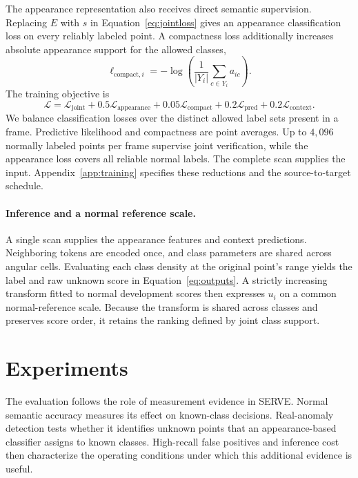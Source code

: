 \documentclass{article}
\begin{document}
The appearance representation also receives direct semantic supervision. Replacing $E$ with $s$ in Equation~\eqref{eq:jointloss} gives an appearance classification loss on every reliably labeled point. A compactness loss additionally increases absolute appearance support for the allowed classes,
\begin{equation}
 \ell_{\mathrm{compact},i}=-\log\left(\frac{1}{|Y_i|}\sum_{c\in Y_i}a_{ic}\right).
 \label{eq:compact}
\end{equation}
The training objective is
\begin{equation}
 \mathcal L=\mathcal L_{\mathrm{joint}}
 +0.5\mathcal L_{\mathrm{appearance}}
 +0.05\mathcal L_{\mathrm{compact}}
 +0.2\mathcal L_{\mathrm{pred}}
 +0.2\mathcal L_{\mathrm{context}}.
 \label{eq:loss}
\end{equation}
We balance classification losses over the distinct allowed label sets present in a frame. Predictive likelihood and compactness are point averages. Up to $4{,}096$ normally labeled points per frame supervise joint verification, while the appearance loss covers all reliable normal labels. The complete scan supplies the input. Appendix~\ref{app:training} specifies these reductions and the source-to-target schedule.

\paragraph{Inference and a normal reference scale.}
A single scan supplies the appearance features and context predictions. Neighboring tokens are encoded once, and class parameters are shared across angular cells. Evaluating each class density at the original point's range yields the label and raw unknown score in Equation~\eqref{eq:outputs}. A strictly increasing transform fitted to normal development scores then expresses $u_i$ on a common normal-reference scale. Because the transform is shared across classes and preserves score order, it retains the ranking defined by joint class support.

\section{Experiments}
\label{sec:experiments}
The evaluation follows the role of measurement evidence in SERVE. Normal semantic accuracy measures its effect on known-class decisions. Real-anomaly detection tests whether it identifies unknown points that an appearance-based classifier assigns to known classes. High-recall false positives and inference cost then characterize the operating conditions under which this additional evidence is useful.
\end{document}
